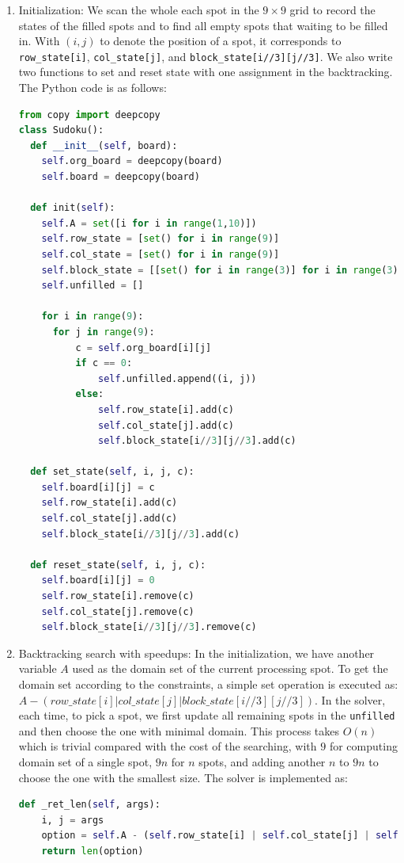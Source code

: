 \documentclass[../main.tex]{subfiles}
\begin{document}
\begin{enumerate}
    \item Initialization: We scan the whole each spot in the $9\times 9$ grid to record the states of the filled spots and to find all empty spots that waiting to be filled in.  With $(i,j)$ to denote the position of a spot, it corresponds to \texttt{row\_state[i]}, \texttt{col\_state[j]}, and \texttt{block\_state[i//3][j//3]}. We also write two functions to set and reset state with one assignment in the backtracking. The Python code is as follows:
\begin{lstlisting}[language=Python]
from copy import deepcopy
class Sudoku():
  def __init__(self, board):
    self.org_board = deepcopy(board)
    self.board = deepcopy(board)
    
  def init(self):
    self.A = set([i for i in range(1,10)])
    self.row_state = [set() for i in range(9)]
    self.col_state = [set() for i in range(9)]
    self.block_state = [[set() for i in range(3)] for i in range(3)]
    self.unfilled = []

    for i in range(9):
      for j in range(9):
          c = self.org_board[i][j]
          if c == 0:
              self.unfilled.append((i, j))
          else:
              self.row_state[i].add(c)
              self.col_state[j].add(c)
              self.block_state[i//3][j//3].add(c)
  
  def set_state(self, i, j, c):
    self.board[i][j] = c
    self.row_state[i].add(c)
    self.col_state[j].add(c)
    self.block_state[i//3][j//3].add(c)
    
  def reset_state(self, i, j, c):
    self.board[i][j] = 0
    self.row_state[i].remove(c)
    self.col_state[j].remove(c)
    self.block_state[i//3][j//3].remove(c)
\end{lstlisting}

\item Backtracking search with speedups:  In the initialization, we have another variable $A$ used as the domain set of the current processing spot. To get the domain set according to the constraints, a simple set operation is executed as: $A-(row\_state[i]|col\_state[j]|block\_state[i//3][j//3])$. In the solver, each time, to pick a spot, we first update all remaining spots in the \texttt{unfilled} and then choose the one with minimal domain. This process takes $O(n)$ which is trivial compared with the cost of the searching, with $9$ for computing domain set of a single spot, $9n$ for $n$ spots, and adding another $n$ to $9n$ to choose the one with the smallest size. The solver is implemented as:
\begin{lstlisting}[language=Python]
  def _ret_len(self, args):
    i, j = args
    option = self.A - (self.row_state[i] | self.col_state[j] | self.block_state[i//3 ][j//3])
    return len(option)
    

\end{lstlisting}
\end{enumerate}
\end{document}
